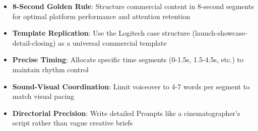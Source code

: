 \begin{itemize}
\item \textbf{8-Second Golden Rule}: Structure commercial content in 8-second segments for optimal platform performance and attention retention
\item \textbf{Template Replication}: Use the Logitech case structure (launch-showcase-detail-closing) as a universal commercial template
\item \textbf{Precise Timing}: Allocate specific time segments (0-1.5s, 1.5-4.5s, etc.) to maintain rhythm control
\item \textbf{Sound-Visual Coordination}: Limit voiceover to 4-7 words per segment to match visual pacing
\item \textbf{Directorial Precision}: Write detailed Prompts like a cinematographer's script rather than vague creative briefs
\end{itemize}
